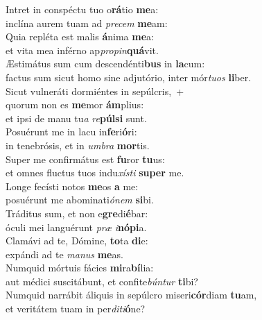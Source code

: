 \evenverse Intret in conspéctu tuo o\textbf{rá}tio \textbf{me}a:~\*\\
\evenverse inclína aurem tuam ad \textit{pre}\textit{cem} \textbf{me}am:\\
\oddverse Quia repléta est malis \textbf{á}nima \textbf{me}a:~\*\\
\oddverse et vita mea inférno ap\textit{pro}\textit{pin}\textbf{quá}vit.\\
\evenverse Æstimátus sum cum descendénti\textbf{bus} in \textbf{la}cum:~\*\\
\evenverse factus sum sicut homo sine adjutório, inter mór\textit{tu}\textit{os} \textbf{li}ber.\\
\oddverse Sicut vulneráti dormiéntes in sepúlcris,~+\\
\oddverse  quorum non es \textbf{me}mor \textbf{ám}plius:~\*\\
\oddverse et ipsi de manu tu\textit{a} \textit{re}\textbf{púl}\textbf{si} sunt.\\
\evenverse Posuérunt me in lacu in\textbf{fe}ri\textbf{ó}ri:~\*\\
\evenverse in tenebrósis, et in \textit{um}\textit{bra} \textbf{mor}tis.\\
\oddverse Super me confirmátus est \textbf{fu}ror \textbf{tu}us:~\*\\
\oddverse et omnes fluctus tuos indu\textit{xí}\textit{sti} \textbf{su}\textbf{per} me.\\
\evenverse Longe fecísti notos \textbf{me}os \textbf{a} me:~\*\\
\evenverse posuérunt me abominati\textit{ó}\textit{nem} \textbf{si}bi.\\
\oddverse Tráditus sum, et non e\textbf{gre}di\textbf{é}bar:~\*\\
\oddverse óculi mei languérunt \textit{præ} \textit{i}\textbf{nó}\textbf{pi}a.\\
\evenverse Clamávi ad te, Dómine, \textbf{to}ta \textbf{di}e:~\*\\
\evenverse expándi ad te \textit{ma}\textit{nus} \textbf{me}as.\\
\oddverse Numquid mórtuis fácies \textbf{mi}ra\textbf{bí}lia:~\*\\
\oddverse aut médici suscitábunt, et confite\textit{bún}\textit{tur} \textbf{ti}bi?\\
\evenverse Numquid narrábit áliquis in sepúlcro miseri\textbf{cór}diam \textbf{tu}am,~\*\\
\evenverse et veritátem tuam in per\textit{di}\textit{ti}\textbf{ó}ne?\\
